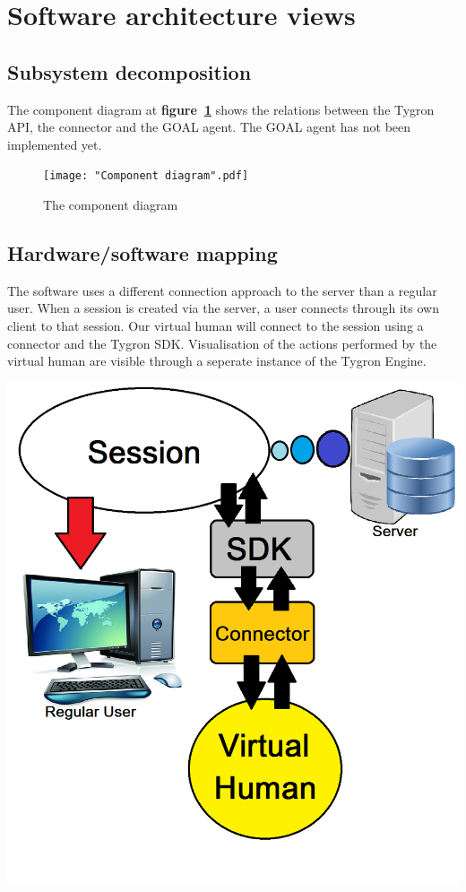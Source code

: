 \usepackage{graphicx}

\label{Software architecture views}
\section{Software architecture views}

\subsection{Subsystem decomposition}

The component diagram at \textbf{figure~\ref{fig:comp_diag}} shows the relations between the Tygron API, the connector and the GOAL agent. The GOAL agent has not been implemented yet. 

\begin{figure}[h]
	  \centering
	  \texttt{[image: "Component diagram".pdf]}
	  \caption{The component diagram}
	  \label{fig:comp_diag}
\end{figure}

\subsection{Hardware/software mapping}
The software uses a different connection approach to the server than a regular user. When a session is created via the server, a user connects through its own client to that session. Our virtual human will connect to the session using a connector and the Tygron SDK. Visualisation of the actions performed by the virtual human are visible through a seperate instance of the Tygron Engine.

\includegraphics{Hardware_software_mapping}

